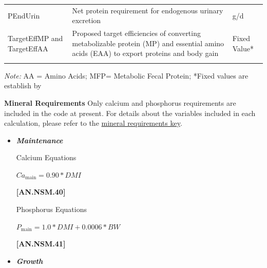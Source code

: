 \documentclass{article}
\begin{document}
\begin{refsection}
\begin{itemize}
\begin{longtable}{@{} L{3.5cm} L{5.5cm} L{3.5cm} @{}}
PEndUrin  &   Net protein requirement for endogenous urinary excretion  &  g/d\\
TargetEffMP and TargetEffAA &  Proposed target efficiencies of converting metabolizable protein (MP) and essential amino acids (EAA) to export proteins and body gain  & Fixed Value* \\
\bottomrule
\endlastfoot
\end{longtable}
    \vspace{-0.3cm}
{\footnotesize\textit{Note:} AA = Amino Acids; MFP= Metabolic Fecal Protein; *Fixed values are establish by \textcite{nrc2021}}
\vspace{0.5cm}


\textbf{ Mineral Requirements} Only calcium and phosphorus requirements are included in the code at present. For details about the variables included in each calculation, please refer to the \hyperref[nasemminkey]{mineral requirements key}.
    \vspace{0.5cm}

\begin{itemize}
    \item \textbf{\textit{Maintenance}} 
    \vspace{0.25cm}
    
Calcium Equations
\vspace{0.25cm}

    \begin{center}
    \(Ca_{\text{main}} =  0.90 * DMI\)
    \end{center}

\vspace{0.5cm}
            {\raggedleft \textbf{[AN.NSM.40]}\par}
            \vspace{0.5cm}

Phosphorus Equations
\vspace{0.25cm}

    \begin{center}
    \(P_{\text{main}} =  1.0 * DMI + 0.0006 * BW\)
    \end{center}

\vspace{0.5cm}
            {\raggedleft \textbf{[AN.NSM.41]}\par}
            \vspace{0.5cm}

    \item \textbf{\textit{Growth}} 
    \vspace{0.25cm}
    

\end{itemize}
\end{itemize}
\end{refsection}
\end{document}
